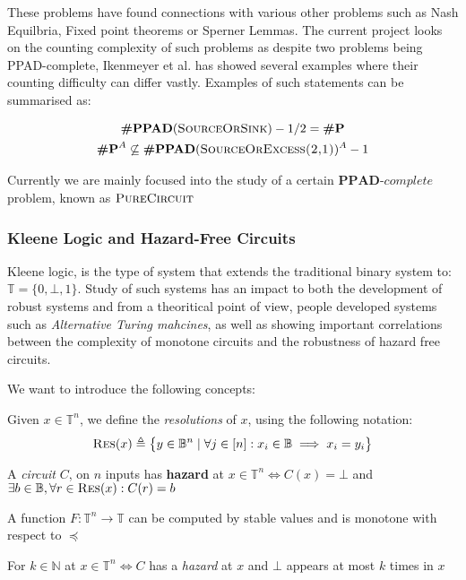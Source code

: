 

These problems have found
connections with various other problems such as Nash Equilbria,
Fixed point theorems or Sperner Lemmas. The current project looks
on the counting complexity of such problems as despite two problems
being PPAD-complete, Ikenmeyer et al. has showed several examples where
their counting difficulty can differ vastly. Examples of such statements
can be summarised as:

\begin{gather*}
    \textbf{\#PPAD}(\textsc{SourceOrSink})-1/2  = \textbf{\#P}\\
    \textbf{\#P}^A \not\subseteq \textbf{\#PPAD}(\textsc{SourceOrExcess(2,1)})^A-1
\end{gather*} 


Currently we are mainly focused into the study of a certain 
$\textbf{PPAD}\textit{-complete}$ problem, known as $\textsc{PureCircuit}$

\subsubsection{Kleene Logic and Hazard-Free Circuits}

Kleene logic, is the type of system that extends the traditional %
binary system to: $\mathbb{T} = \{0, \bot,1 \}$. 
Study of such systems has an impact to both
the development of robust systems and from a theoritical point of view,
people developed systems such as \textit{Alternative Turing mahcines}, as well as
showing important correlations between the complexity of monotone circuits
and the robustness of hazard free circuits. 

We want to introduce the following concepts:

\begin{definition}
    Given $x \in \mathbb{T}^n$, we define the \textit{resolutions} of $x$, using the following notation:
    $$
    \textnormal{\textsc{Res}}(x) \triangleq \big\{ y \in \mathbb{B}^n \mid \forall j \in [n]: x_i \in \mathbb{B} \implies x_i = y_i \big\}
    $$
\end{definition}

\begin{definition}
    A \textit{circuit} $C$, on $n$ inputs has \textbf{hazard} at $x \in \mathbb{T}^n \iff C(x) = \bot$
    and $\exists b \in \mathbb{B}, \forall r \in \textnormal{\textsc{Res}}(x): C(r) = b$
\end{definition}


\begin{definition}
    A function $F: \mathbb{T}^n \to \mathbb{T}$ can be computed by stable values and is monotone with respect to $\preceq$
\end{definition}

\begin{definition}
    For $k \in \mathbb{N}$ at $x \in \mathbb{T}^n \iff C$  has a \textit{hazard} at $x$ and $\bot$ appears at most $k$ times in $x$
\end{definition}



